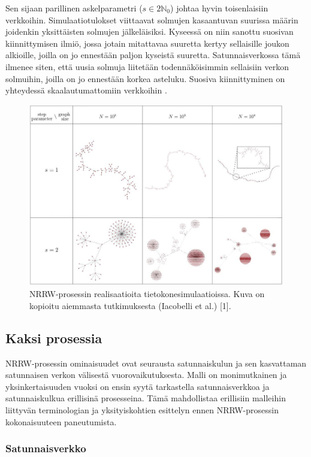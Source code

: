 \documentclass[finnish, 12pt, a4paper, sci, utf8, pdfa]{aaltothesis}
\newcommand{\N}{\mathbb{N}}
\begin{document}
Sen sijaan parillinen askelparametri (\( s \in 2\N_{0} \)) johtaa hyvin toisenlaisiin verkkoihin. Simulaatiotulokset viittaavat solmujen kasaantuvan suurissa määrin joidenkin yksittäisten solmujen jälkeläisiksi. Kyseessä on niin sanottu suosivan kiinnittymisen ilmiö, jossa jotain mitattavaa suuretta kertyy sellaisille joukon alkioille, joilla on jo ennestään paljon kyseistä suuretta. Satunnaisverkossa tämä ilmenee siten, että uusia solmuja liitetään todennäköisimmin sellaisiin verkon solmuihin, joilla on jo ennestään korkea asteluku. Suosiva kiinnittyminen on yhteydessä skaalautumattomiin verkkoihin \cite{Babarasi}.

\begin{figure}[htb]
\centering
\includegraphics[width=.9\textwidth]{pictures/simulations.jpg}
   \caption{NRRW-prosessin realisaatioita tietokonesimulaatioissa. Kuva on kopioitu aiemmasta tutkimuksesta (Iacobelli et al.) [1]. \label{simulaatiot}}
\end{figure}

\subsection{Kaksi prosessia}

NRRW-prosessin ominaisuudet ovat seurausta satunnaiskulun ja sen kasvattaman satunnaisen verkon välisestä vuorovaikutuksesta. Malli on monimutkainen ja yksinkertaisuuden vuoksi on ensin syytä tarkastella satunnaisverkkoa ja satunnaiskulkua erillisinä prosesseina. Tämä mahdollistaa erillisiin malleihin liittyvän terminologian ja yksityiskohtien esittelyn ennen NRRW-prosessin kokonaisuuteen paneutumista.

\subsubsection{Satunnaisverkko}
\end{document}
